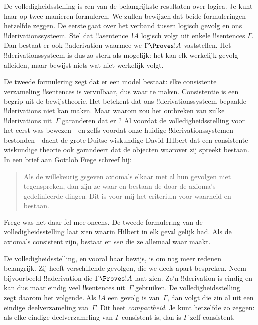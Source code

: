 \documentclass[../../../include/open-logic-section]{subfiles}
\begin{document}
      {}
      {}


De volledigheidsstelling is een van de belangrijkste resultaten over
logica. Je kunt haar op twee manieren formuleren. We zullen bewijzen
dat beide formuleringen hetzelfde zeggen. De eerste gaat over het
verband tussen logisch gevolg en ons !!{derivation}ssysteem. Stel dat
!!a{sentence}~$!A$ logisch volgt uit enkele !!{sentence}s $\Gamma$.
Dan bestaat er ook !!a{derivation} waarmee we
$\Gamma \Proves !A$ vaststellen. Het !!{derivation}ssysteem is dus zo
sterk als mogelijk: het kan elk werkelijk gevolg afleiden, maar bewijst
niets wat niet werkelijk volgt.

De tweede formulering zegt dat er een model bestaat: elke consistente
verzameling !!{sentence}s is vervulbaar, dus waar te maken.
Consistentie is een begrip uit de bewijstheorie. Het betekent dat ons
!!{derivation}ssysteem bepaalde !!{derivation}s niet kan maken. Maar
waarom zou het ontbreken van zulke !!{derivation}s uit~$\Gamma$
garanderen dat er
? Al voordat
de volledigheidsstelling voor het eerst was bewezen---en zelfs voordat
onze huidige !!{derivation}ssystemen bestonden---dacht de grote Duitse
wiskundige David Hilbert dat een consistente wiskundige theorie ook
garandeert dat de objecten waarover zij spreekt bestaan. In een brief
aan Gottlob Frege schreef hij:
\begin{quote}
  Als de willekeurig gegeven axioma's elkaar met al hun gevolgen niet
  tegenspreken, dan zijn ze waar en bestaan de door de axioma's
  gedefinieerde dingen. Dit is voor mij het criterium voor waarheid en
  bestaan.
\end{quote}
Frege was het daar fel mee oneens. De tweede formulering van de
volledigheidsstelling laat zien waarin Hilbert in elk geval gelijk had.
Als de axioma's consistent zijn, bestaat er \emph{een}
 die ze allemaal waar maakt.

De volledigheidsstelling, en vooral haar bewijs, is om nog meer redenen
belangrijk. Zij heeft verschillende gevolgen, die we deels apart
bespreken. Neem bijvoorbeeld !!a{derivation} die
$\Gamma \Proves !A$ laat zien. Zo'n !!{derivation} is eindig en kan dus
maar eindig veel !!{sentence}s uit~$\Gamma$ gebruiken. De
volledigheidsstelling zegt daarom het volgende. Als $!A$ een gevolg is
van~$\Gamma$, dan volgt die zin al uit een eindige deelverzameling
van~$\Gamma$. Dit heet \emph{compactheid}. Je kunt hetzelfde zo zeggen:
als elke eindige deelverzameling van $\Gamma$ consistent is, dan is
$\Gamma$ zelf consistent.
\end{document}
